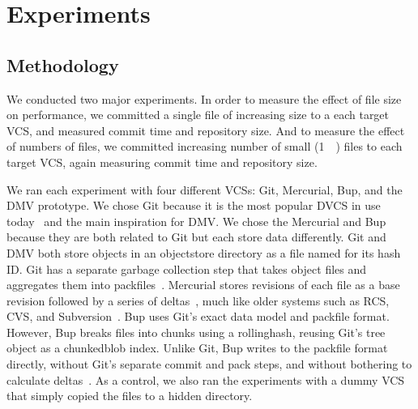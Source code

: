 \section{Experiments}

\subsection{Methodology}

We conducted two major experiments.
In order to measure the effect of file size on performance, we committed a single file of increasing size to a each target \gls{VCS}, and measured commit time and repository size.
And to measure the effect of numbers of files, we committed increasing number of small (\SI{1}{\kibi\byte}) files to each target \gls{VCS}, again measuring commit time and repository size.

We ran each experiment with four different \glspl{VCS}: Git, Mercurial, Bup, and the DMV prototype.
We chose Git because it is the most popular \gls{DVCS} in use today~\cite{what_are_devs_talking_about} and the main inspiration for DMV.
We chose the Mercurial and Bup because they are both related to Git but each store data differently.
Git and DMV both store objects in an \gls{objectstore} directory as a file named for its hash ID.
Git has a separate garbage collection step that takes object files and aggregates them into \glspl{packfile}~\cite[Section 10.7]{git_book}.
Mercurial stores revisions of each file as a base revision followed by a series of deltas~\cite[Chapter 4]{hgbook}, much like older systems such as RCS, CVS, and Subversion~\cite{history_of_version_control}.
Bup uses Git's exact data model and \gls{packfile} format.
However, Bup breaks files into chunks using a \gls{rollinghash}, reusing Git's \gls{tree} object as a \gls{chunkedblob} index\footnotemark.
Unlike Git, Bup writes to the \gls{packfile} format directly, without Git's separate commit and pack steps, and without bothering to calculate deltas~\cite{bup_design}.
As a control, we also ran the experiments with a dummy \gls{VCS} that simply copied the files to a hidden directory.


